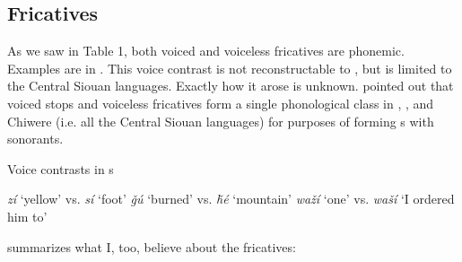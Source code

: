 \documentclass[output=paper]{LSP/langsci}
\begin{document}
\subsection{Fricatives}

As we saw in Table 1, both voiced and voiceless fricatives are phonemic. Examples are in . This voice contrast is not reconstructable to , but is limited to the Central Siouan languages. Exactly how it arose is unknown. \citet{Miner1979a} pointed out that voiced stops and voiceless fricatives form a single phonological class in , ,  and Chiwere (i.e. all the Central Siouan languages) for purposes of forming s with sonorants.

\begin{exe}
\ex \label{ex:rood:4}
Voice contrasts in  s
\begin{xlist}
\ex \textit{zí} `yellow' vs. \textit{sí} `foot'
\ex \textit{\v{g}ú} `burned' vs. \textit{\v{h}é} `mountain'
\ex \textit{wa\v{z}í} `one' vs. \textit{wa\v{s}í} `I ordered him to'
\end{xlist}
\end{exe}

\citet[4]{Rankin2001} summarizes what I, too, believe about the fricatives:
\end{document}
